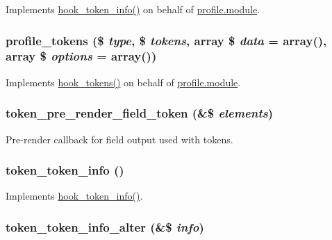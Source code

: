 \label{token_8tokens_8inc_ab97ba048343fb5e851742c14a5094dff}
Implements \hyperlink{group__hooks_gab868597197cf36911f95dcd29ae0b954}{hook\_\-token\_\-info()} on behalf of \hyperlink{profile_8module}{profile.module}. \hypertarget{token_8tokens_8inc_a4518396f5dcfa6d62520bcde83355887}{
\subsubsection[{profile\_\-tokens}]{\setlength{\rightskip}{0pt plus 5cm}profile\_\-tokens (\$ {\em type}, \/  \$ {\em tokens}, \/  array \$ {\em data} = {\ttfamily array()}, \/  array \$ {\em options} = {\ttfamily array()})}}
\label{token_8tokens_8inc_a4518396f5dcfa6d62520bcde83355887}
Implements \hyperlink{group__hooks_ga3bfd87d9a19b2397b0f970e1cff7ea4f}{hook\_\-tokens()} on behalf of \hyperlink{profile_8module}{profile.module}. \hypertarget{token_8tokens_8inc_af364a1d0d72ea86fb76670a270ceb7fe}{
\subsubsection[{token\_\-pre\_\-render\_\-field\_\-token}]{\setlength{\rightskip}{0pt plus 5cm}token\_\-pre\_\-render\_\-field\_\-token (\&\$ {\em elements})}}
\label{token_8tokens_8inc_af364a1d0d72ea86fb76670a270ceb7fe}
Pre-\/render callback for field output used with tokens. \hypertarget{token_8tokens_8inc_a4f24fde1a5b2d27bae2edf4e415ebb67}{
\subsubsection[{token\_\-token\_\-info}]{\setlength{\rightskip}{0pt plus 5cm}token\_\-token\_\-info ()}}
\label{token_8tokens_8inc_a4f24fde1a5b2d27bae2edf4e415ebb67}
Implements \hyperlink{group__hooks_gab868597197cf36911f95dcd29ae0b954}{hook\_\-token\_\-info()}. \hypertarget{token_8tokens_8inc_ad634dc57d9d19bb21135a670ef40e95f}{
\subsubsection[{token\_\-token\_\-info\_\-alter}]{\setlength{\rightskip}{0pt plus 5cm}token\_\-token\_\-info\_\-alter (\&\$ {\em info})}}
